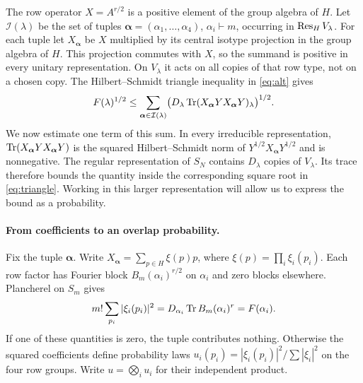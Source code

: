 The row operator $X=A^{r/2}$ is a positive element of the group algebra of
$H$. Let $\mathcal I(\lambda)$ be the set of tuples
$\boldsymbol\alpha=(\alpha_1,\ldots,\alpha_4)$, $\alpha_i\vdash m$,
occurring in $\operatorname{Res}_H V_\lambda$. For each tuple let
$X_{\boldsymbol\alpha}$ be $X$ multiplied by its central isotype
projection in the group algebra of $H$. This projection commutes with $X$,
so the summand is positive in every unitary representation. On $V_\lambda$
it acts on all copies of that row type, not on a chosen copy.
The Hilbert--Schmidt triangle inequality in \eqref{eq:alt} gives
\begin{equation}\label{eq:triangle}
 F(\lambda)^{1/2}\le
 \sum_{\boldsymbol\alpha\in\mathcal I(\lambda)}
 \bigl(D_\lambda\operatorname{Tr}(X_{\boldsymbol\alpha}Y
                         X_{\boldsymbol\alpha}Y)_\lambda\bigr)^{1/2}.
\end{equation}
We now estimate one term of this sum. In every irreducible representation,
$\operatorname{Tr}(X_{\boldsymbol\alpha}Y X_{\boldsymbol\alpha}Y)$ is the squared
Hilbert--Schmidt norm of $Y^{1/2}X_{\boldsymbol\alpha}Y^{1/2}$ and is
nonnegative. The regular representation of $S_N$ contains $D_\lambda$
copies of $V_\lambda$. Its trace therefore bounds the quantity inside
the corresponding square root in \eqref{eq:triangle}. Working in this
larger representation will allow us to express the bound as a probability.

\paragraph{From coefficients to an overlap probability.}
Fix the tuple $\boldsymbol\alpha$. Write
$X_{\boldsymbol\alpha}=\sum_{p\in H}\xi(p)p$, where
$\xi(p)=\prod_i\xi_i(p_i)$. Each row factor has Fourier block
$B_m(\alpha_i)^{r/2}$ on $\alpha_i$ and zero blocks elsewhere.
Plancherel on $S_m$ gives
\[
 m!\sum_{p_i}|\xi_i(p_i)|^2
 =D_{\alpha_i}\operatorname{Tr} B_m(\alpha_i)^r=F(\alpha_i).
\]
If one of these quantities is zero, the tuple contributes nothing.
Otherwise the squared coefficients define probability laws
$u_i(p_i)=|\xi_i(p_i)|^2/\sum|\xi_i|^2$ on the four row groups.
Write $u=\bigotimes_i u_i$ for their independent product.

